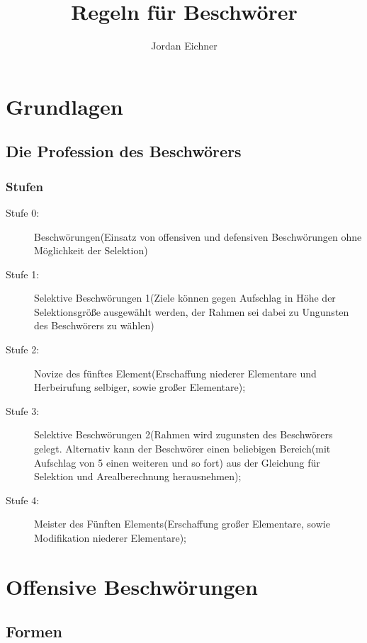 \documentclass[a4paper,12pt,oneside]{book}
\title{Regeln für Beschwörer}
\author{Jordan Eichner}
\date{}
\begin{document}
\maketitle
\tableofcontents

\part{Grundlagen}

\chapter{Die Profession des Beschwörers}

\section{Stufen}
\begin{description}
\item[Stufe 0:] Beschwörungen(Einsatz von offensiven und defensiven Beschwörungen ohne Möglichkeit der Selektion)
\item[Stufe 1:] Selektive Beschwörungen 1(Ziele können gegen Aufschlag in Höhe der Selektionsgröße ausgewählt werden, der Rahmen sei dabei zu Ungunsten des Beschwörers zu wählen)
\item[Stufe 2:] Novize des fünftes Element(Erschaffung niederer Elementare und Herbeirufung selbiger, sowie großer Elementare);
\item[Stufe 3:] Selektive Beschwörungen 2(Rahmen wird zugunsten des Beschwörers gelegt. Alternativ kann der Beschwörer einen beliebigen Bereich(mit Aufschlag von 5 einen weiteren und so fort) aus der Gleichung für Selektion und Arealberechnung herausnehmen);
\item[Stufe 4:] Meister des Fünften Elements(Erschaffung großer Elementare, sowie Modifikation niederer Elementare);
\end{description}


\part{Offensive Beschwörungen}

\chapter{Formen}
\end{document}
